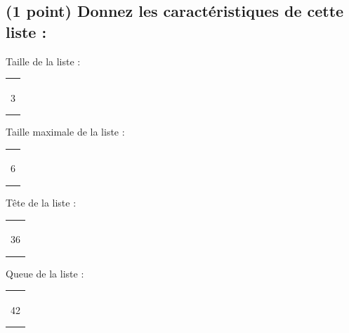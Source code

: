 \documentclass[11pt,a4paper]{article}
\begin{document}
\bigskip

\subsection{(1 point) Donnez les caractéristiques de cette liste : }

\bigskip

\begin{table}[h!]
  \centering
  \begin{minipage}{0.25\textwidth}
    \centering
Taille de la liste :

\medskip

\begin{tabular}{ | m{2.5cm} | }
\hline
 \\ \\ \\
3
 \\ \\ \\
\hline
\end{tabular}

  \end{minipage}
  \hfillx
  \begin{minipage}{0.25\textwidth}
    \centering
Taille maximale de la liste :

\medskip

\begin{tabular}{ | m{2.5cm} | }
\hline
 \\ \\ \\
6
 \\ \\ \\
\hline
\end{tabular}

  \end{minipage}
  \hfillx
  \begin{minipage}{0.25\textwidth}
    \centering
Tête de la liste :

\medskip

\begin{tabular}{ | m{2.5cm} | }
\hline
 \\ \\ \\
36
 \\ \\ \\
\hline
\end{tabular}

  \end{minipage}
  \hfillx
  \begin{minipage}{0.25\textwidth}
    \centering
Queue de la liste :

\medskip

\begin{tabular}{ | m{2.5cm} | }
\hline
 \\ \\ \\
42
 \\ \\ \\
\hline
\end{tabular}

  \end{minipage}
\end{table}
\end{document}
